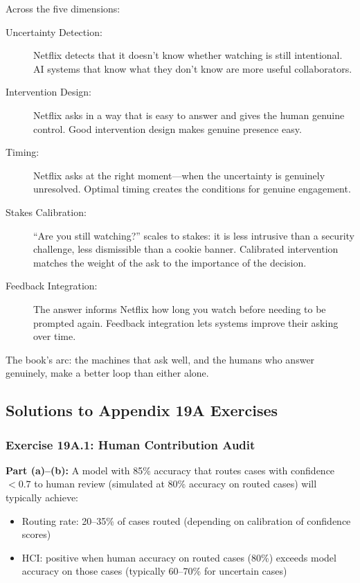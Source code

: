 Across the five dimensions:
\begin{description}
    \item[Uncertainty Detection:] Netflix detects that it doesn't know whether watching is still intentional. AI systems that know what they don't know are more useful collaborators.
    \item[Intervention Design:] Netflix asks in a way that is easy to answer and gives the human genuine control. Good intervention design makes genuine presence easy.
    \item[Timing:] Netflix asks at the right moment---when the uncertainty is genuinely unresolved. Optimal timing creates the conditions for genuine engagement.
    \item[Stakes Calibration:] ``Are you still watching?'' scales to stakes: it is less intrusive than a security challenge, less dismissible than a cookie banner. Calibrated intervention matches the weight of the ask to the importance of the decision.
    \item[Feedback Integration:] The answer informs Netflix how long you watch before needing to be prompted again. Feedback integration lets systems improve their asking over time.
\end{description}

The book's arc: the machines that ask well, and the humans who answer genuinely, make a better loop than either alone.

\subsection*{Solutions to Appendix 19A Exercises}

\subsubsection*{Exercise 19A.1: Human Contribution Audit}

\textbf{Part (a)--(b):} A model with 85\% accuracy that routes cases with confidence $<0.7$ to human review (simulated at 80\% accuracy on routed cases) will typically achieve:
\begin{itemize}
    \item Routing rate: 20--35\% of cases routed (depending on calibration of confidence scores)
    \item HCI: positive when human accuracy on routed cases (80\%) exceeds model accuracy on those cases (typically 60--70\% for uncertain cases)
\end{itemize}

